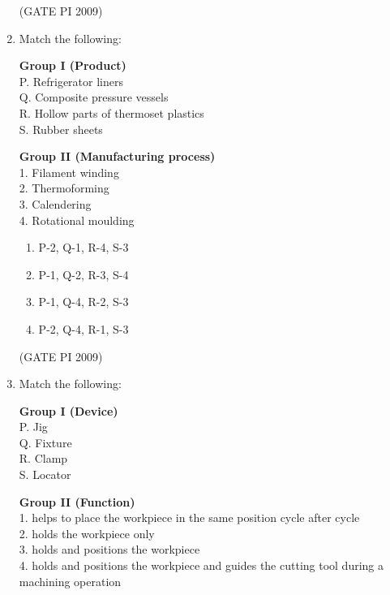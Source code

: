\documentclass[journal,12pt,onecolumn]{IEEEtran}
\theoremstyle{remark}
\begin{document}
\begin{enumerate}[label=Q.\arabic*, leftmargin=*]
\hfill (GATE PI 2009)
\noindent 
\item Match the following:

\noindent
\begin{minipage}[t]{0.45\textwidth}
\textbf{Group I (Product)}\\[0.5em]
P. Refrigerator liners \\
Q. Composite pressure vessels \\
R. Hollow parts of thermoset plastics \\
S. Rubber sheets
\end{minipage}
\hfill
\begin{minipage}[t]{0.45\textwidth}
\textbf{Group II (Manufacturing process)}\\[0.5em]
1. Filament winding \\
2. Thermoforming \\
3. Calendering \\
4. Rotational moulding
\end{minipage}


\begin{multicols}{2}
\begin{enumerate}[label=(\Alph*)]
    \item P-2, Q-1, R-4, S-3
    \item P-1, Q-2, R-3, S-4
    \item P-1, Q-4, R-2, S-3
    \item P-2, Q-4, R-1, S-3
\end{enumerate}
\end{multicols}
\hfill (GATE PI 2009)
\noindent 
\item Match the following:

\noindent
\begin{minipage}[t]{0.45\textwidth}
\textbf{Group I (Device)}\\[0.5em]
P. Jig \\
Q. Fixture \\
R. Clamp \\
S. Locator
\end{minipage}
\hfill
\begin{minipage}[t]{0.45\textwidth}
\textbf{Group II (Function)}\\[0.5em]
1. helps to place the workpiece in the same position cycle after cycle \\
2. holds the workpiece only \\
3. holds and positions the workpiece \\
4. holds and positions the workpiece and guides the cutting tool during a machining operation
\end{minipage}



\end{enumerate}
\end{document}
